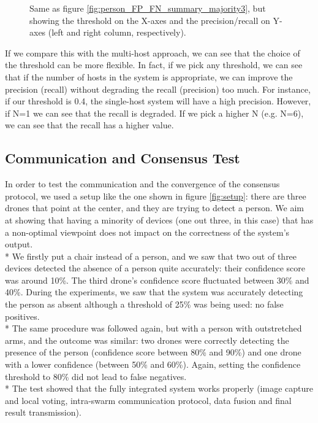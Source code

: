 \documentclass[10pt,conference,compsocconf]{IEEEtran}
\begin{document}
\begin{enumerate}
\begin{figure}
	\caption {Same as figure \ref{fig:person_FP_FN_summary_majority3}, but showing the threshold on the X-axes and the precision/recall on Y-axes (left and right column, respectively).}
	\label{fig:thresholds_plot1}
\end{figure}
If we compare this with the multi-host approach, we can see that the choice of the threshold can be more flexible. In fact, if we pick any threshold, we can see that if the number of hosts in the system is appropriate, we can improve the precision (recall) without degrading the recall (precision) too much.
For instance, if our threshold is 0.4, the single-host system will have a high precision. However, if N=1 we can see that the recall is degraded. If we pick a higher N (e.g. N=6), we can see that the recall has a higher value.
\subsection{Communication and Consensus Test}
In order to test the communication and the convergence of the consensus protocol, we used a setup like the one shown in figure \ref{fig:setup}: there are three drones that point at the center, and they are trying to detect a person. We aim at showing that having a minority of devices (one out three, in this case) that has a non-optimal viewpoint does not impact on the correctness of the system's output.\\*
We firstly put a chair instead of a person, and we saw that two out of three devices detected the absence of a person quite accurately: their confidence score was around 10\%. The third drone's confidence score fluctuated between 30\% and 40\%. During the experiments, we saw that the system was accurately detecting the person as absent although a threshold of 25\% was being used: no false positives.\\*
The same procedure was followed again, but with a person with outstretched arms, and the outcome was similar: two drones were correctly detecting the presence of the person (confidence score between 80\% and 90\%) and one drone with a lower confidence (between 50\% and 60\%). Again, setting the confidence threshold to 80\% did not lead to false negatives.\\*
The test showed that the fully integrated system works properly (image capture and local voting, intra-swarm communication protocol, data fusion and final result transmission).

\end{enumerate}
\end{document}
